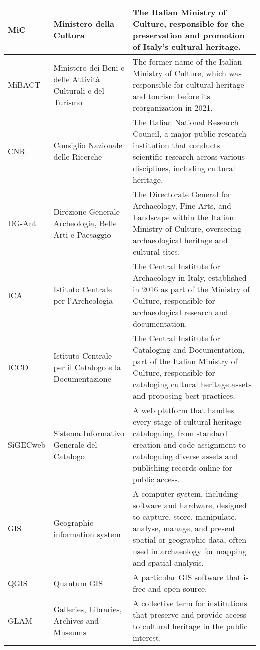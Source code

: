 \begin{tabularx}{\textwidth}{
  >{\raggedright\arraybackslash}p{2.5cm}
  >{\raggedright\arraybackslash}p{4cm}
  >{\noindent\justifying\arraybackslash}X
}
\cmidrule(lr){1-3}
MiC & Ministero della Cultura & The Italian Ministry of Culture, responsible for the preservation and promotion of Italy's cultural heritage. \\
\cmidrule(lr){1-3}
MiBACT & Ministero dei Beni e delle Attività Culturali e del Turismo & The former name of the Italian Ministry of Culture, which was responsible for cultural heritage and tourism before its reorganization in 2021. \\
\cmidrule(lr){1-3}
CNR & Consiglio Nazionale delle Ricerche & The Italian National Research Council, a major public research institution that conducts scientific research across various disciplines, including cultural heritage. \\
\cmidrule(lr){1-3}
DG-Ant & Direzione Generale Archeologia, Belle Arti e Paesaggio & The Directorate General for Archaeology, Fine Arts, and Landscape within the Italian Ministry of Culture, overseeing archaeological heritage and cultural sites. \\
\cmidrule(lr){1-3}
ICA & Istituto Centrale per l’Archeologia & The Central Institute for Archaeology in Italy, established in 2016 as part of the Ministry of Culture, responsible for archaeological research and documentation. \\
\cmidrule(lr){1-3}
ICCD & Istituto Centrale per il Catalogo e la Documentazione & The Central Institute for Cataloging and Documentation, part of the Italian Ministry of Culture, responsible for cataloging cultural heritage assets and proposing best practices. \\
\cmidrule(lr){1-3}
SiGECweb &  Sistema Informativo Generale del Catalogo & A web platform that handles every stage of cultural heritage cataloguing, from standard creation and code assignment to cataloguing diverse assets and publishing records online for public access. \\
\cmidrule(lr){1-3}
GIS & Geographic information system & A computer system, including software and hardware, designed to capture, store, manipulate, analyse, manage, and present spatial or geographic data, often used in archaeology for mapping and spatial analysis. \\
\cmidrule(lr){1-3}
QGIS & Quantum GIS & A particular GIS software that is free and open-source. \\
\cmidrule(lr){1-3}
GLAM   & Galleries, Libraries, Archives and Museums & A collective term for institutions that preserve and provide access to cultural heritage in the public interest. \\

\end{tabularx}
